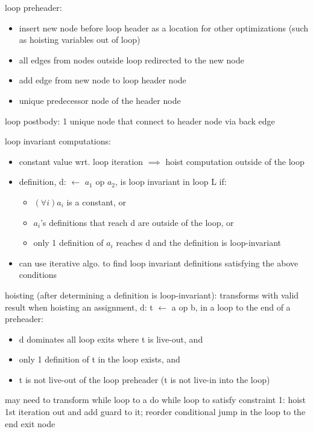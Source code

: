 \documentclass[8pt]{extarticle}
\begin{document}
\begin{multicols*}{2}
  loop preheader:
  \begin{itemize}
  \item insert new node before loop header as a location for other optimizations (such as hoisting variables out of loop)
  \item all edges from nodes outside loop redirected to the new node
  \item add edge from new node to loop header node
  \item unique predecessor node of the header node
  \end{itemize}

  loop postbody: 1 unique node that connect to header node via back edge

  loop invariant computations:
  \begin{itemize}
  \item constant value wrt. loop iteration $\implies$ hoist computation outside of the loop
  \item definition, d: $\leftarrow$ $a_1$ op $a_2$, is loop invariant in loop L if:
    \begin{itemize}
    \item $(\forall i) a_i$ is a constant, or
    \item $a_i$'s definitions that reach d are outside of the loop, or
    \item only 1 definition of $a_i$ reaches d and the definition is loop-invariant
    \end{itemize}
  \item can use iterative algo. to find  loop invariant definitions satisfying the above conditions
  \end{itemize}

  hoisting (after determining a definition is loop-invariant): transforms with valid result when hoisting an assignment, d: t $\leftarrow$ a op b, in a loop to the end of a preheader:
  \begin{itemize}
  \item d dominates all loop exits where t is live-out, and
  \item only 1 definition of t in the loop exists, and
  \item t is not live-out of the loop preheader (t is not live-in into the loop)
  \end{itemize}

  may need to transform while loop to a do while loop to satisfy constraint 1: hoist 1st iteration out and add guard to it; reorder conditional jump in the loop to the end exit node


\end{multicols*}
\end{document}
